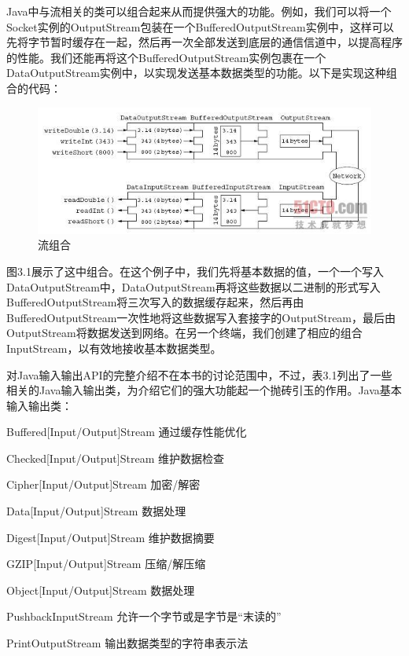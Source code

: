 	Java中与流相关的类可以组合起来从而提供强大的功能。例如，我们可以将一个Socket实例的OutputStream包装在一个BufferedOutputStream实例中，这样可以先将字节暂时缓存在一起，然后再一次全部发送到底层的通信信道中，以提高程序的性能。我们还能再将这个BufferedOutputStream实例包裹在一个DataOutputStream实例中，以实现发送基本数据类型的功能。以下是实现这种组合的代码： 

	

	\begin{figure}[htbp]%
		\centering
		\includegraphics[scale=.8]{img/03.01.jpg}
		\caption{流组合}
		\label{fig:comp.stream}
	\end{figure}

	图3.1展示了这中组合。在这个例子中，我们先将基本数据的值，一个一个写入DataOutputStream中，DataOutputStream再将这些数据以二进制的形式写入BufferedOutputStream将三次写入的数据缓存起来，然后再由BufferedOutputStream一次性地将这些数据写入套接字的OutputStream，最后由OutputStream将数据发送到网络。在另一个终端，我们创建了相应的组合InputStream，以有效地接收基本数据类型。 

	对Java输入输出API的完整介绍不在本书的讨论范围中，不过，表3.1列出了一些相关的Java输入输出类，为介绍它们的强大功能起一个抛砖引玉的作用。Java基本输入输出类：

	Buffered[Input/Output]Stream 通过缓存性能优化

	Checked[Input/Output]Stream  维护数据检查

	Cipher[Input/Output]Stream   加密/解密 

	Data[Input/Output]Stream     数据处理 

	Digest[Input/Output]Stream   维护数据摘要 

	GZIP[Input/Output]Stream     压缩/解压缩 

	Object[Input/Output]Stream   数据处理 

	PushbackInputStream          允许一个字节或是字节是“末读的”

	PrintOutputStream            输出数据类型的字符串表示法

